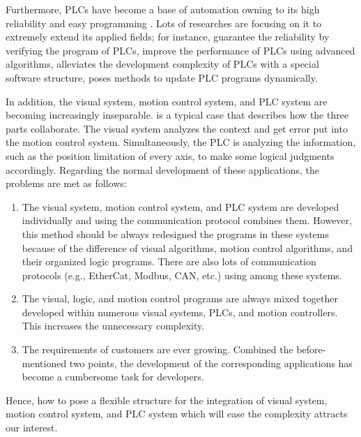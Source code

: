 \documentclass[journal,UTF8]{IEEEtran}
\begin{document}
Furthermore, PLCs have become a base of automation owning to its high reliability and easy programming \cite{Hossain2014Advanced}. Lots of researches are focusing on it to extremely extend its applied fields; for instance, \cite{Jiang2013System,Jiang2013Bayesian} guarantee the reliability by verifying the program of PLCs, \cite{Gerk2006Advanced,Dominic2016PLC} improve the performance of PLCs using advanced algorithms, \cite{wu2018customized} alleviates the development complexity of PLCs with a special software structure, \cite{Sch2013Development} poses methods to update PLC programs dynamically.


In addition, the visual system, motion control system, and PLC system are becoming increasingly inseparable. \cite{Chen2014A} is a typical case that describes how the three parts collaborate. The visual system analyzes the context and get error put into the motion control system. Simultaneously, the PLC is analyzing the information, such as the position limitation of every axis, to make some logical judgments accordingly. Regarding the normal development of these applications, the problems are met as follows:
 \begin{enumerate}
 	\item The visual system, motion control system, and PLC system are developed individually and using the communication protocol combines them. However, this method should be always redesigned the programs in these systems because of the difference of visual algorithms, motion control algorithms, and their organized logic programs. There are also lots of communication protocols (e.g., EtherCat, Modbus, CAN, etc.) using among these systems. 
 	\item The visual, logic, and motion control programs are always mixed together developed within numerous visual systems, PLCs, and motion controllers. This increases the unnecessary complexity. 
 	\item The requirements of customers are ever growing. Combined the before-mentioned two points, the development of the corresponding applications has become a cumbersome task for developers. 
 \end{enumerate}

Hence, how to pose a flexible structure for the integration of visual system, motion control system, and PLC system which will ease the complexity attracts our interest.
\end{document}
